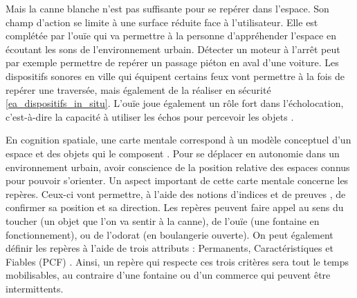 Mais la canne blanche n'est pas suffisante pour se repérer dans l'espace. Son champ d'action se limite à une surface réduite face à l'utilisateur. Elle est complétée par l'ouïe qui va permettre à la personne d'appréhender l'espace en écoutant les sons de l'environnement urbain. Détecter un moteur à l'arrêt peut par exemple permettre de repérer un passage piéton en aval d'une voiture. Les dispositifs sonores en ville qui équipent certains feux vont permettre à la fois de repérer une traversée, mais également de la réaliser en sécurité \ref{ea_dispositifs_in_situ}. L'ouïe joue également un rôle fort dans l'écholocation, c’est-à-dire la capacité à utiliser les échos pour percevoir les objets \cite{Brazier2008}.



\newpar{}

En cognition spatiale, une carte mentale correspond à un modèle conceptuel d'un espace et des objets qui le composent \cite{Jacobson1998}. Pour se déplacer en autonomie dans un environnement urbain, avoir conscience de la position relative des espaces connus pour pouvoir s'orienter. Un aspect important de cette carte mentale concerne les repères. Ceux-ci vont permettre, à l'aide des notions d'indices et de preuves \cite{Giudice2010}, de confirmer sa position et sa direction. Les repères peuvent faire appel au sens du toucher (un objet que l'on va sentir à la canne), de l'ouïe (une fontaine en fonctionnement), ou de l'odorat (en boulangerie ouverte). On peut également définir les repères à l'aide de trois attributs : Permanents, Caractéristiques et Fiables (PCF) \cite{Denis2023}. Ainsi, un repère qui respecte ces trois critères sera tout le temps mobilisables, au contraire d'une fontaine ou d'un commerce qui peuvent être intermittents. 



